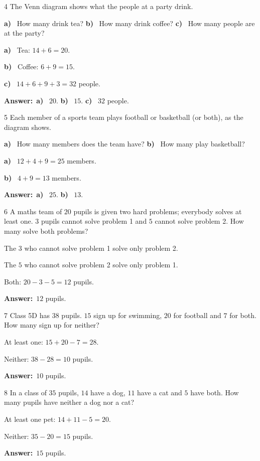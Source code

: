 \documentclass[11pt]{article}
\newif\ifsol \solfalse
\providecommand{\AnsWord}{Đáp số}
\newcommand{\dapso}[1]{\par\textbf{\AnsWord:}\ #1}
\newcommand{\probsol}[1]{%
  \begin{lrbox}{\solmeasure}\begin{minipage}{\dimexpr\linewidth-24pt\relax}#1\end{minipage}\end{lrbox}%
  \ifsol
    \begin{solbox}#1\end{solbox}%
  \else
    \setlength{\solht}{\dimexpr\ht\solmeasure+\dp\solmeasure+0.85cm\relax}%
    \ifdim\solht<1.35cm\setlength{\solht}{1.35cm}\fi
    \begin{tcolorbox}[colback=white,colframe=Line,boxrule=0.8pt,arc=5pt,
      left=8pt,right=8pt,top=4pt,bottom=4pt,height=\solht]{\footnotesize\color{Slate}\itshape\WorkWord}\end{tcolorbox}%
  \fi}
\newcommand{\pa}[1]{\textbf{#1)}\ }
\newcommand{\gap}{\vspace{0.3cm}}
\def\WorkWord{Your work:}
\def\AnsWord{Answer}
\begin{document}
\gap
\needspace{7.5cm}
\begin{probbox}{4}{\relax}
The Venn diagram shows what the people at a party drink.
\begin{center}
\end{center}
\pa{a} How many drink tea? \quad \pa{b} How many drink coffee? \quad \pa{c} How many people are at the party?
\end{probbox}
\probsol{
\pa{a} Tea: $14+6=20$.\par
\pa{b} Coffee: $6+9=15$.\par
\pa{c} $14+6+9+3=32$ people.
\dapso{\pa{a} $20$. \pa{b} $15$. \pa{c} $32$ people.}}
\gap
\needspace{7.5cm}
\begin{probbox}{5}{\relax}
Each member of a sports team plays football or basketball (or both), as the diagram shows.
\begin{center}
\end{center}
\pa{a} How many members does the team have? \quad \pa{b} How many play basketball?
\end{probbox}
\probsol{
\pa{a} $12+4+9=25$ members.\par
\pa{b} $4+9=13$ members.
\dapso{\pa{a} $25$. \pa{b} $13$.}}
\gap
\begin{probbox}{6}{\relax}
A maths team of $20$ pupils is given two hard problems; everybody solves at least one. $3$ pupils cannot solve problem 1 and $5$ cannot solve problem 2. How many solve both problems?
\end{probbox}
\probsol{
The $3$ who cannot solve problem 1 solve only problem 2.\par The $5$ who cannot solve problem 2 solve only problem 1.\par
Both: $20-3-5=12$ pupils.
\dapso{$12$ pupils.}}
\gap
\begin{probbox}{7}{\relax}
Class 5D has $38$ pupils. $15$ sign up for swimming, $20$ for football and $7$ for both. How many sign up for neither?
\end{probbox}
\probsol{
At least one: $15+20-7=28$.\par Neither: $38-28=10$ pupils.
\dapso{$10$ pupils.}}
\gap
\begin{probbox}{8}{\relax}
In a class of $35$ pupils, $14$ have a dog, $11$ have a cat and $5$ have both. How many pupils have neither a dog nor a cat?
\end{probbox}
\probsol{
At least one pet: $14+11-5=20$.\par Neither: $35-20=15$ pupils.
\dapso{$15$ pupils.}}
\end{document}
